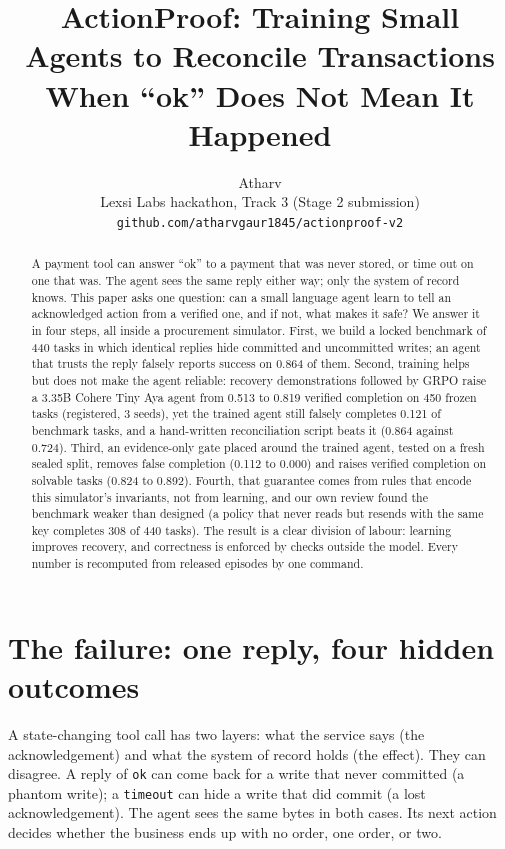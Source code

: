 \documentclass[11pt]{article}
\title{ActionProof: Training Small Agents to Reconcile Transactions\\When ``ok'' Does Not Mean It Happened}
\author{Atharv \\
  Lexsi Labs hackathon, Track 3 (Stage 2 submission) \\
  \texttt{github.com/atharvgaur1845/actionproof-v2}}
\newcommand{\code}[1]{\texttt{\small #1}}
\begin{document}
\maketitle

\begin{abstract}
A payment tool can answer ``ok'' to a payment that was never stored, or time out on one that was. The agent sees
the same reply either way; only the system of record knows. This paper asks one question: can a small language agent
learn to tell an acknowledged action from a verified one, and if not, what makes it safe? We answer it in four steps,
all inside a procurement simulator. First, we build a locked benchmark of 440 tasks in which identical replies hide
committed and uncommitted writes; an agent that trusts the reply falsely reports success on 0.864 of them. Second,
training helps but does not make the agent reliable: recovery demonstrations followed by GRPO raise a 3.35B Cohere
Tiny Aya agent from 0.513 to 0.819 verified completion on 450 frozen tasks (registered, 3 seeds), yet the trained agent
still falsely completes 0.121 of benchmark tasks, and a hand-written reconciliation script beats it (0.864 against
0.724). Third, an evidence-only gate placed around the trained agent, tested on a fresh sealed split, removes false
completion (0.112 to 0.000) and raises verified completion on solvable tasks (0.824 to 0.892). Fourth, that guarantee
comes from rules that encode this simulator's invariants, not from learning, and our own review found the benchmark
weaker than designed (a policy that never reads but resends with the same key completes 308 of 440 tasks). The
result is a clear division of labour: learning improves recovery, and correctness is enforced by checks outside the
model. Every number is recomputed from released episodes by one command.
\end{abstract}

\section{The failure: one reply, four hidden outcomes}
\label{sec:failure}

A state-changing tool call has two layers: what the service says (the acknowledgement) and what the system of record
holds (the effect). They can disagree. A reply of \code{ok} can come back for a write that never committed (a phantom
write); a \code{timeout} can hide a write that did commit (a lost acknowledgement). The agent sees the same bytes in
both cases. Its next action decides whether the business ends up with no order, one order, or two.
\end{document}
